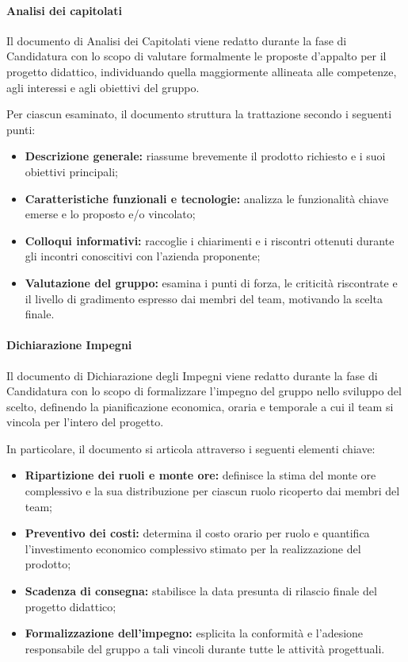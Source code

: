 \documentclass[documento]{gpt}
\newcommand{\subsubsubsection}[1]{\paragraph{#1}}
\begin{document}
	\subsubsubsection{Analisi dei capitolati}
	Il documento di Analisi dei Capitolati viene redatto durante la fase di Candidatura con lo scopo di valutare formalmente le proposte d'appalto per il progetto didattico, individuando quella maggiormente allineata alle competenze, agli interessi e agli obiettivi del gruppo.
	
	Per ciascun  esaminato, il documento struttura la trattazione secondo i seguenti punti:
	\begin{itemize}
		\item \textbf{Descrizione generale:} riassume brevemente il prodotto richiesto e i suoi obiettivi principali;
		\item \textbf{Caratteristiche funzionali e tecnologie:} analizza le funzionalità chiave emerse e lo  proposto e/o vincolato;
		\item \textbf{Colloqui informativi:} raccoglie i chiarimenti e i riscontri ottenuti durante gli incontri conoscitivi con l'azienda proponente;
		\item \textbf{Valutazione del gruppo:} esamina i punti di forza, le criticità riscontrate e il livello di gradimento espresso dai membri del team, motivando la scelta finale.
	\end{itemize}
	
	\subsubsubsection{Dichiarazione Impegni}
	Il documento di Dichiarazione degli Impegni viene redatto durante la fase di Candidatura con lo scopo di formalizzare l'impegno del gruppo nello sviluppo del  scelto, definendo la pianificazione economica, oraria e temporale a cui il team si vincola per l'intero  del progetto.
	
	In particolare, il documento si articola attraverso i seguenti elementi chiave:
	\begin{itemize}
		\item \textbf{Ripartizione dei ruoli e monte ore:} definisce la stima del monte ore complessivo e la sua distribuzione per ciascun ruolo ricoperto dai membri del team;
		\item \textbf{Preventivo dei costi:} determina il costo orario per ruolo e quantifica l'investimento economico complessivo stimato per la realizzazione del prodotto;
		\item \textbf{Scadenza di consegna:} stabilisce la data presunta di rilascio finale del progetto didattico;
		\item \textbf{Formalizzazione dell'impegno:} esplicita la conformità e l'adesione responsabile del gruppo a tali vincoli durante tutte le attività progettuali.
	\end{itemize}
	
\end{document}

